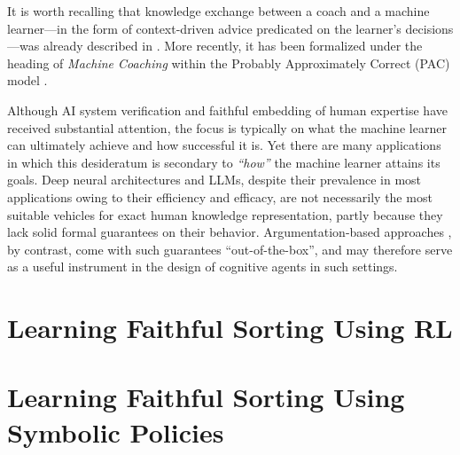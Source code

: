 \documentclass[runningheads]{llncs}
\begin{document}
It is worth recalling that knowledge exchange between a coach and a machine learner---in the form of context-driven advice predicated on the learner's decisions---was already described in \cite{mccarthyProgramsCommonSense1959}. More recently, it has been formalized under the heading of \emph{Machine Coaching} \cite{michaelAdviceTaker2017,michaelMachineCoaching2019} within the Probably Approximately Correct (PAC) model \cite{valiantPAC1984}.

Although AI system verification and faithful embedding of human expertise have received substantial attention, the focus is typically on what the machine learner can ultimately achieve and how successful it is. Yet there are many applications in which this desideratum is secondary to \emph{``how''} the machine learner attains its goals. Deep neural architectures and LLMs, despite their prevalence in most applications owing to their efficiency and efficacy, are not necessarily the most suitable vehicles for exact human knowledge representation, partly because they lack solid formal guarantees on their behavior. Argumentation-based approaches \cite{DUNG1995321,prakkenAnAbstractFrameworkFA2010}, by contrast, come with such guarantees ``out-of-the-box'', and may therefore serve as a useful instrument in the design of cognitive agents in such settings.
%
%
%
\section{Learning Faithful Sorting Using RL}\label{sec:Learning Faithful Sorting using RL}
%

%
%
%
\section{Learning Faithful Sorting Using Symbolic Policies}
%

%
%
%
\end{document}
